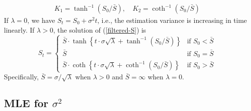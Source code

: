 \documentclass[mnsc]{informs3}
\begin{document}
\begin{APPENDICES}
\begin{align*}
	K_1 = \tanh^{-1}(S_0/\bar{S}),\quad
	K_2 = \coth^{-1}(S_0/\bar{S})
\end{align*}
If $\lambda = 0$, we have $S_t = S_0+\sigma^2t$, i.e., the estimation variance is increasing in time linearly.
If $\lambda > 0$, the solution of (\ref{filtered-S}) is
\begin{equation*}
	S_t =
	\begin{cases}
        \bar{S} \cdot \tanh\left\{t\cdot\sigma\sqrt{\lambda} +  \tanh^{-1}\left(S_0\big/\bar{S}\right)\right\} & \text{if } S_0 < \bar{S} \\
        \bar{S} & \text{if } S_0 = \bar{S} \\
        \bar{S} \cdot \coth\left\{t\cdot\sigma\sqrt{\lambda} +  \coth^{-1}\left(S_0\big/\bar{S}\right)\right\} & \text{if } S_0 > \bar{S}
	\end{cases}
\end{equation*}
Specifically, $\bar{S} = \sigma / \sqrt{\lambda}$ when $\lambda>0$ and $\bar{S} = \infty$ when $\lambda = 0$.


\subsection{MLE for $\sigma^2$}\label{appexidx-normal-MLE}


\end{APPENDICES}
\end{document}

